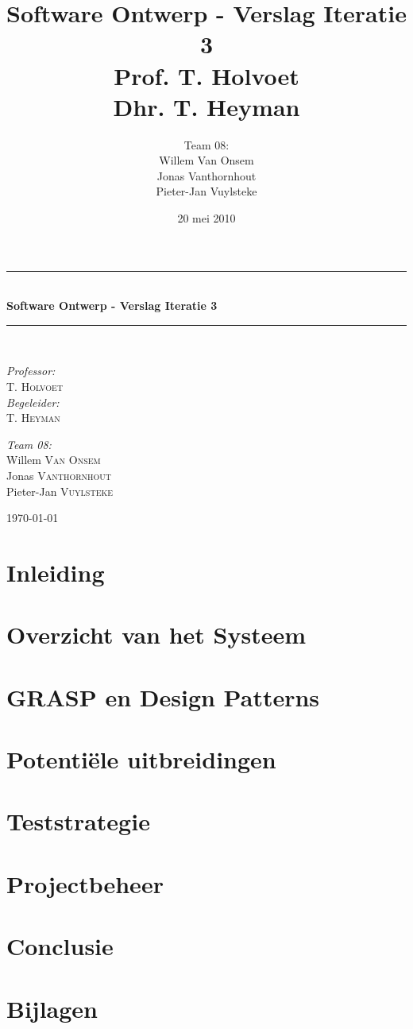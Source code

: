 \documentclass[a4paper,titlepage]{article}
\title{Software Ontwerp - Verslag Iteratie 3\\Prof. T. Holvoet\\Dhr. T. Heyman}
\author{Team 08:\\Willem Van Onsem\\Jonas Vanthornhout\\Pieter-Jan Vuylsteke}
\date{20 mei 2010}
\newcommand{\HRule}{\rule{\linewidth}{0.5mm}}
\begin{document}
\begin{empfile}
\begin{titlepage}
\begin{center}
\HRule \\[0.4cm]
{ \huge \bfseries Software Ontwerp - Verslag Iteratie 3}\\[0.4cm]
\HRule \\[1.5cm]
\begin{minipage}{0.4\textwidth}
\begin{flushleft} \large
\emph{Professor:}\\
T. \textsc{Holvoet}\\
\emph{Begeleider:}\\
T. \textsc{Heyman}
\end{flushleft}
\end{minipage}
\begin{minipage}{0.4\textwidth}
\begin{flushright} \large
\emph{Team 08:} \\
Willem \textsc{Van Onsem}\\
Jonas \textsc{Vanthornhout}\\
Pieter-Jan \textsc{Vuylsteke}
\end{flushright}
\end{minipage}

\vfill

{\large \today}
\end{center}
\end{titlepage}
\tableofcontents
\newpage
\section*{Inleiding}

\newpage
\section{Overzicht van het Systeem}

\section{GRASP en Design Patterns}

\section{Potenti\"ele uitbreidingen}

\section{Teststrategie}

\section{Projectbeheer}

\section{Conclusie}

\newpage
\appendix
\section{Bijlagen}

\end{empfile}
\end{document}
